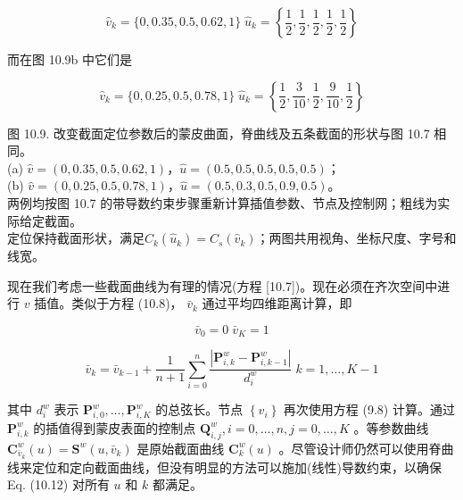 \documentclass[../main.tex]{subfiles}
\begin{document}
\[
{\widehat{v}}_{k} = \{ 0,{0.35},{0.5},{0.62},1\} \;{\widehat{u}}_{k} = \left\{  {\frac{1}{2},\frac{1}{2},\frac{1}{2},\frac{1}{2},\frac{1}{2}}\right\}
\]

而在图 10.9b 中它们是

\[
{\widehat{v}}_{k} = \{ 0,{0.25},{0.5},{0.78},1\} \;{\widehat{u}}_{k} = \left\{  {\frac{1}{2},\frac{3}{10},\frac{1}{2},\frac{9}{10},\frac{1}{2}}\right\}
\]

\begin{center}
\begin{minipage}{34cm}
\vspace*{.6\baselineskip}
\centering
{}
\par\smallskip
图 10.9. 改变截面定位参数后的蒙皮曲面，脊曲线及五条截面的形状与图 10.7 相同。\\
(a) $\widehat v=(0,0.35,0.5,0.62,1)$，$\widehat u=(0.5,0.5,0.5,0.5,0.5)$；\\
(b) $\widehat v=(0,0.25,0.5,0.78,1)$，$\widehat u=(0.5,0.3,0.5,0.9,0.5)$。\\
两例均按图 10.7 的带导数约束步骤重新计算插值参数、节点及控制网；粗线为实际给定截面。\\
定位保持截面形状，满足$C_k(\widehat u_k)=C_s(\widehat v_k)$；两图共用视角、坐标尺度、字号和线宽。
\end{minipage}
\end{center}

现在我们考虑一些截面曲线为有理的情况(方程 [10.7])。现在必须在齐次空间中进行 \(v\) 插值。类似于方程 (10.8)， \({\bar{v}}_{k}\) 通过平均四维距离计算，即

\[
{\bar{v}}_{0} = 0\;{\bar{v}}_{K} = 1
\]

\[
{\bar{v}}_{k} = {\bar{v}}_{k - 1} + \frac{1}{n + 1}\mathop{\sum }\limits_{{i = 0}}^{n}\frac{\left| {\mathbf{P}}_{i,k}^{w} - {\mathbf{P}}_{i,k - 1}^{w}\right| }{{d}_{i}^{w}}\;k = 1,\ldots ,K - 1 \tag{10.14}
\]

其中 \({d}_{i}^{w}\) 表示 \({\mathbf{P}}_{i,0}^{w},\ldots ,{\mathbf{P}}_{i,K}^{w}\) 的总弦长。节点 \(\left\{  {v}_{i}\right\}\) 再次使用方程 (9.8) 计算。通过 \({\mathbf{P}}_{i,k}^{w}\) 的插值得到蒙皮表面的控制点 \({\mathbf{Q}}_{i,j}^{w},i = 0,\ldots ,n,j = 0,\ldots ,K\) 。等参数曲线 \({\mathbf{C}}_{{\bar{v}}_{k}}^{w}\left( u\right)  = {\mathbf{S}}^{w}\left( {u,{\bar{v}}_{k}}\right)\) 是原始截面曲线 \({\mathbf{C}}_{k}^{w}\left( u\right)\) 。尽管设计师仍然可以使用脊曲线来定位和定向截面曲线，但没有明显的方法可以施加(线性)导数约束，以确保 Eq. (10.12) 对所有 \(u\) 和 \(k\) 都满足。
\end{document}
